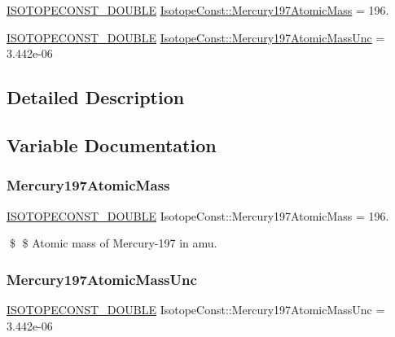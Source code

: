 \begin{DoxyCompactItemize}
\item 
\mbox{\hyperlink{group___isotope_const-_macros_ga8f45a7272ce02c0b4c65c44636ed719a}{I\+S\+O\+T\+O\+P\+E\+C\+O\+N\+S\+T\+\_\+\+D\+O\+U\+B\+LE}} \mbox{\hyperlink{group___isotope_const-_mercury-_hg197_ga212812594c7d1dc59664448d9c3daa94}{Isotope\+Const\+::\+Mercury197\+Atomic\+Mass}} = 196.
\item 
\mbox{\hyperlink{group___isotope_const-_macros_ga8f45a7272ce02c0b4c65c44636ed719a}{I\+S\+O\+T\+O\+P\+E\+C\+O\+N\+S\+T\+\_\+\+D\+O\+U\+B\+LE}} \mbox{\hyperlink{group___isotope_const-_mercury-_hg197_gaf0d4bbf13a13f7bb40b165664db299d3}{Isotope\+Const\+::\+Mercury197\+Atomic\+Mass\+Unc}} = 3.\+442e-\/06
\end{DoxyCompactItemize}


\subsection{Detailed Description}


\subsection{Variable Documentation}
\mbox{\label{group___isotope_const-_mercury-_hg197_ga212812594c7d1dc59664448d9c3daa94}} 
\subsubsection{\texorpdfstring{Mercury197\+Atomic\+Mass}{Mercury197AtomicMass}}
{\footnotesize\ttfamily \mbox{\hyperlink{group___isotope_const-_macros_ga8f45a7272ce02c0b4c65c44636ed719a}{I\+S\+O\+T\+O\+P\+E\+C\+O\+N\+S\+T\+\_\+\+D\+O\+U\+B\+LE}} Isotope\+Const\+::\+Mercury197\+Atomic\+Mass = 196.}

\$ \$ Atomic mass of Mercury-\/197 in amu. \mbox{\label{group___isotope_const-_mercury-_hg197_gaf0d4bbf13a13f7bb40b165664db299d3}} 
\subsubsection{\texorpdfstring{Mercury197\+Atomic\+Mass\+Unc}{Mercury197AtomicMassUnc}}
{\footnotesize\ttfamily \mbox{\hyperlink{group___isotope_const-_macros_ga8f45a7272ce02c0b4c65c44636ed719a}{I\+S\+O\+T\+O\+P\+E\+C\+O\+N\+S\+T\+\_\+\+D\+O\+U\+B\+LE}} Isotope\+Const\+::\+Mercury197\+Atomic\+Mass\+Unc = 3.\+442e-\/06}

